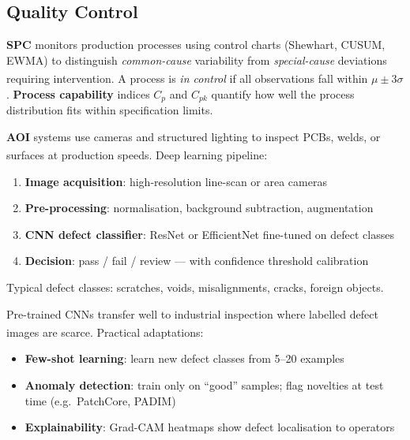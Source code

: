 \subsection{Quality Control}

\begin{tcbitemize}[ skin=sectionraster ]
    \tcbitem[title={Statistical Process Control (SPC)}, raster multicolumn=3]
    \textbf{SPC} monitors production processes using control charts (Shewhart, CUSUM, EWMA) to distinguish \emph{common-cause} variability from \emph{special-cause} deviations requiring intervention\textsuperscript{\cite[][pp.~5--10]{leeSurveyPredictiveMaintenance2019}}.
    A process is \emph{in control} if all observations fall within $\mu \pm 3\sigma$.
    \textbf{Process capability} indices $C_p$ and $C_{pk}$ quantify how well the process distribution fits within specification limits.

    \tcbitem[title={Automated Optical Inspection (AOI)}, raster multicolumn=3]
    \textbf{AOI} systems use cameras and structured lighting to inspect PCBs, welds, or surfaces at production speeds\textsuperscript{\cite[][pp.~108--110]{laviollaCNNDefectDetection2019}}.
    Deep learning pipeline:
    \begin{enumerate}
        \item \textbf{Image acquisition}: high-resolution line-scan or area cameras
        \item \textbf{Pre-processing}: normalisation, background subtraction, augmentation
        \item \textbf{CNN defect classifier}: ResNet or EfficientNet fine-tuned on defect classes
        \item \textbf{Decision}: pass / fail / review — with confidence threshold calibration
    \end{enumerate}
    Typical defect classes: scratches, voids, misalignments, cracks, foreign objects.

    \tcbitem[title={CNN-Based Visual Inspection}, raster multicolumn=3]
    Pre-trained CNNs transfer well to industrial inspection where labelled defect images are scarce\textsuperscript{\cite[][pp.~112--115]{laviollaCNNDefectDetection2019}}.
    Practical adaptations:
    \begin{itemize}
        \item \textbf{Few-shot learning}: learn new defect classes from 5--20 examples
        \item \textbf{Anomaly detection}: train only on ``good'' samples; flag novelties at test time (e.g.\ PatchCore, PADIM)
        \item \textbf{Explainability}: Grad-CAM heatmaps show defect localisation to operators
    \end{itemize}
\end{tcbitemize}

